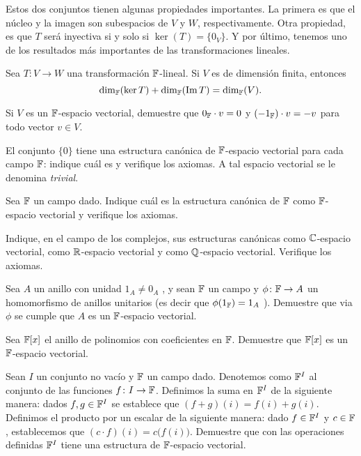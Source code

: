 Estos dos conjuntos tienen algunas propiedades importantes. La primera es que el núcleo y la imagen son subespacios de $V$ y $W$, respectivamente. Otra propiedad, es que $T$ será inyectiva si y solo si $\ker(T) = \{0_V\}$. Y por último, tenemos uno de los resultados más importantes de las transformaciones lineales.
\begin{teor}
  Sea $T \colon V \to W$ una transformación $\mathbb{F}$-lineal. Si $V$ es de dimensión finita, entonces
    \[  \dim_{\mathbb{F}}( \ker T )  + \dim_{\mathbb{F}}( \operatorname{Im} T) = \dim_{\mathbb{F}} (V). \]
\end{teor}




\ExerciseSection


\begin{exerciselist}
  \item Si $V$ es un $\mathbb{F}$-espacio vectorial, demuestre que $0_{\mathbb{F}} \cdot v = 0$ y $(-1_{\mathbb{F}}) \cdot v = -v$ para todo vector $v \in V$.

  \item El conjunto $\{0\}$ tiene una estructura canónica de $\mathbb{F}$-espacio vectorial para cada campo $\mathbb{F}$: indique cuál es y verifique los axiomas. A tal espacio vectorial se le denomina \emph{trivial}.
  
  \item Sea $\mathbb{F}$ un campo dado. Indique cuál es la estructura canónica de $\mathbb{F}$ como $\mathbb{F}$-espacio vectorial y verifique los axiomas.
  
  \item Indique, en el campo de los complejos, sus estructuras canónicas como $\mathbb{C}$-espacio vectorial, como $\mathbb{R}$-espacio vectorial y como $\mathbb{Q}$-espacio vectorial. Verifique los axiomas.
  
  \item Sea $A$ un anillo con unidad $1_A \neq 0_A$ , y sean $\mathbb{F}$ un campo y $\phi\colon \mathbb{F} \to A$ un homomorfismo de anillos unitarios (es decir que $\phi(1_{\mathbb{F}}) = 1_A$ ). Demuestre que via $\phi$ se cumple que $A$ es un $\mathbb{F}$-espacio vectorial.
  
  \item Sea $\mathbb{F}[x]$ el anillo de polinomios con coeficientes en $\mathbb{F}$. Demuestre que $\mathbb{F}[x]$ es un $\mathbb{F}$-espacio vectorial.
  
  \item \label{exer:F^I} Sean $I$ un conjunto no vacío y $\mathbb{F}$ un campo dado. Denotemos como $\mathbb{F}^I$ al conjunto de las funciones $f\colon I \to \mathbb{F}$. Definimos la suma en $\mathbb{F}^I$ de la siguiente manera: dados $f, g \in \mathbb{F}^I$ se establece que $(f + g)(i) = f(i) + g(i)$. Definimos el producto por un escalar de la siguiente manera: dado $f \in \mathbb{F}^I$ y $c \in \mathbb{F}$, establecemos que $(c \cdot f )(i) = c \bigl( f(i) \bigr)$. Demuestre que con las operaciones definidas $\mathbb{F}^I$ tiene una estructura de $\mathbb{F}$-espacio vectorial.
  

\end{exerciselist}
